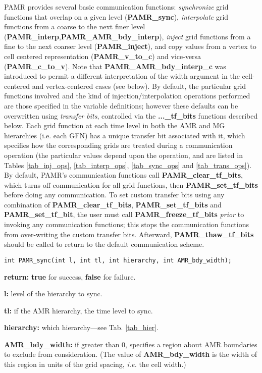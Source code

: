 \documentclass[aps,amssymb,unsortedaddress,nofootinbib]{revtex4}
\def\lsep{\itemsep 0.05in}
\begin{document}
PAMR provides several basic communication functions: {\em synchronize} grid functions
that overlap on a given level ({\bf PAMR\_sync}), {\em interpolate} 
grid functions from a coarse to the
next finer level ({\bf PAMR\_interp},{\bf PAMR\_AMR\_bdy\_interp}), 
{\em inject} grid functions from a fine to the next coarser level ({\bf PAMR\_inject}),
and copy values from a vertex to cell centered representation ({\bf PAMR\_v\_to\_c}) 
and vice-versa ({\bf PAMR\_c\_to\_v}).  Note that {\bf PAMR\_AMR\_bdy\_interp\_c} was
introduced to permit a different interpretation of the width argument in the 
cell-centered and vertex-centered cases (see below).
By default, the particular grid functions involved and the kind of injection/interpolation 
operations performed are those specified in the variable definitions; however these
defaults can be overwritten using {\em transfer bits}, controlled via the
{\bf...\_tf\_bits} functions described below. Each grid function at each time 
level in both the AMR and MG hierarchies (i.e. each GFN) has a unique transfer bit associated with
it, which specifies how the corresponding grids are treated during a communication
operation (the particular values depend upon the operation, and are listed in
Tables \ref{tab_inj_ops}, \ref{tab_interp_ops}, \ref{tab_sync_ops} and \ref{tab_trans_ops}).
By default, PAMR's communication functions call {\bf PAMR\_clear\_tf\_bits}, which turns off
communication for all grid functions, then {\bf PAMR\_set\_tf\_bits} before doing any 
communication. To set custom transfer bits using any combination of
{\bf PAMR\_clear\_tf\_bits}, {\bf PAMR\_set\_tf\_bits} and {\bf PAMR\_set\_tf\_bit},
the user must call {\bf PAMR\_freeze\_tf\_bits} {\em prior} to invoking any communication
functions; this stops the communication functions from over-writing the custom transfer bits.
Afterward, {\bf PAMR\_thaw\_tf\_bits} should be called
to return to the default communication scheme.


\begin{verbatim}
int PAMR_sync(int l, int tl, int hierarchy, int AMR_bdy_width);
\end{verbatim}
\begin{list}{}{\lsep}
\item {\bf return:} {\bf true} for success, {\bf false} for failure.
\item {\bf l:} level of the hierarchy to sync.
\item {\bf tl:} if the AMR hierarchy, the time level to sync.
\item {\bf hierarchy:} which hierarchy---see Tab. \ref{tab_hier}.
\item {\bf AMR\_bdy\_width:} if greater than 0, specifies a region about 
                             AMR boundaries to exclude from consideration.
			     (The value of {\bf AMR\_bdy\_width} is the width
			     of this region in units of the grid spacing, {\it i.e.}
			     the cell width.)
\end{list}
\end{document}
